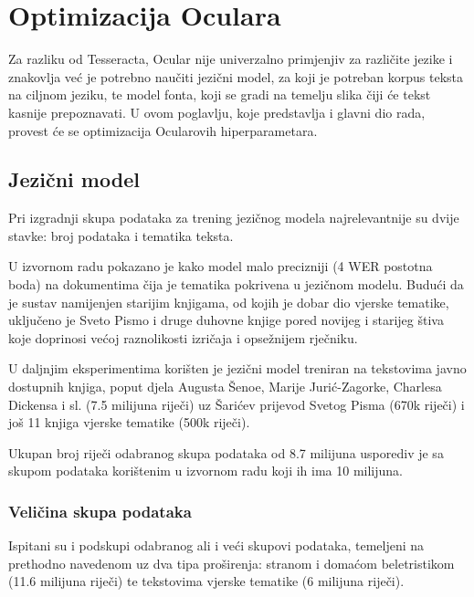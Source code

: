 \documentclass[zavrsnirad]{fer}
\begin{document}
\chapter{Optimizacija Oculara}
\label{pog:optimizacija_oculara}

Za razliku od Tesseracta, Ocular nije univerzalno primjenjiv za različite jezike i znakovlja već je potrebno naučiti jezični model, za koji je potreban korpus teksta na ciljnom jeziku, te model fonta, koji se gradi na temelju slika čiji će tekst kasnije prepoznavati. U ovom poglavlju, koje predstavlja i glavni dio rada, provest će se optimizacija Ocularovih hiperparametara.

\section{Jezični model}

Pri izgradnji skupa podataka za trening jezičnog modela najrelevantnije su dvije stavke: broj podataka i tematika teksta.

U izvornom radu pokazano je kako model malo precizniji (4 WER postotna boda) na dokumentima čija je tematika pokrivena u jezičnom modelu. Budući da je sustav namijenjen starijim knjigama, od kojih je dobar dio vjerske tematike, uključeno je Sveto Pismo i druge duhovne knjige pored novijeg i starijeg štiva koje doprinosi većoj raznolikosti izričaja i opsežnijem rječniku.
\cite{Berg2013}

U daljnjim eksperimentima korišten je jezični model treniran na tekstovima javno dostupnih knjiga, poput djela Augusta Šenoe, Marije Jurić-Zagorke, Charlesa Dickensa i sl. (7.5 milijuna riječi) uz Šarićev prijevod Svetog Pisma (670k riječi) i još 11 knjiga vjerske tematike (500k riječi). 

Ukupan broj riječi odabranog skupa podataka od 8.7 milijuna usporediv je sa skupom podataka korištenim u izvornom radu koji ih ima 10 milijuna.

\subsection{Veličina skupa podataka}

Ispitani su i podskupi odabranog ali i veći skupovi podataka, temeljeni na prethodno navedenom uz dva tipa proširenja: stranom i domaćom beletristikom (11.6 milijuna riječi) te tekstovima vjerske tematike (6 milijuna riječi).
\end{document}
